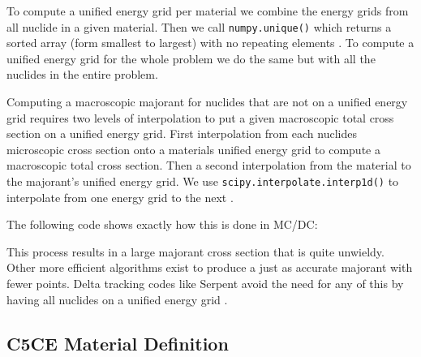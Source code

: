 To compute a unified energy grid per material we combine the energy grids from all nuclide in a given material. 
Then we call \texttt{numpy.unique()} which returns a sorted array (form smallest to largest) with no repeating elements \cite{van_der_walt_numpy_2011}.
To compute a unified energy grid for the whole problem we do the same but with all the nuclides in the entire problem.

Computing a macroscopic majorant for nuclides that are not on a unified energy grid requires two levels of interpolation to put a given macroscopic total cross section on a unified energy grid.
First interpolation from each nuclides microscopic cross section onto a materials unified energy grid to compute a macroscopic total cross section.
Then a second interpolation from the material to the majorant's unified energy grid.
We use \texttt{scipy.interpolate.interp1d()} to interpolate from one energy grid to the next \cite{2020SciPy-NMeth:a}. 

The following code shows exactly how this is done in MC/DC:



This process results in a large majorant cross section that is quite unwieldy.
Other more efficient algorithms exist to produce a just as accurate majorant with fewer points.
Delta tracking codes like Serpent avoid the need for any of this by having all nuclides on a unified energy grid \cite{leppanen_2015_serpent}.

\newpage

\subsection*{C5CE Material Definition}
\label{app:c5ce_mat}
